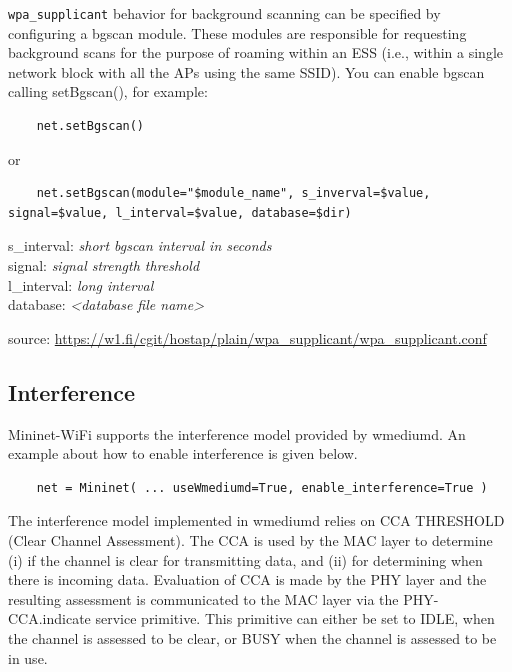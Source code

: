 \texttt{wpa\_supplicant} behavior for background scanning can be specified by configuring a bgscan module. These modules are responsible for requesting background scans for the purpose of roaming within an ESS (i.e., within a single network block with all the APs using the same SSID). You can enable bgscan calling setBgscan(), for example:

\begin{verbatim}
    net.setBgscan()
\end{verbatim}
or
\begin{verbatim}
    net.setBgscan(module="$module_name", s_inverval=$value, signal=$value, l_interval=$value, database=$dir)
\end{verbatim}


\noindent s\_interval: \textit{short bgscan interval in seconds} \\
signal: \textit{signal strength threshold} \\
l\_interval: \textit{long interval} \\
database: \textit{<database file name>}

\noindent source: \url{https://w1.fi/cgit/hostap/plain/wpa_supplicant/wpa_supplicant.conf}

\subsection{Interference}
Mininet-WiFi supports the interference model provided by wmediumd. An example about how to enable interference is given below.

\begin{verbatim}
    net = Mininet( ... useWmediumd=True, enable_interference=True )
\end{verbatim}

The interference model implemented in wmediumd relies on CCA THRESHOLD (Clear Channel Assessment). The CCA is used by the MAC layer to determine (i) if the channel is clear for transmitting data, and (ii) for determining when there is incoming data. Evaluation of CCA is made by the PHY layer and the resulting assessment is communicated to the MAC layer via the PHY-CCA.indicate service primitive. This primitive can either be set to IDLE, when the channel is assessed to be clear, or BUSY when the channel is assessed to be in use.


